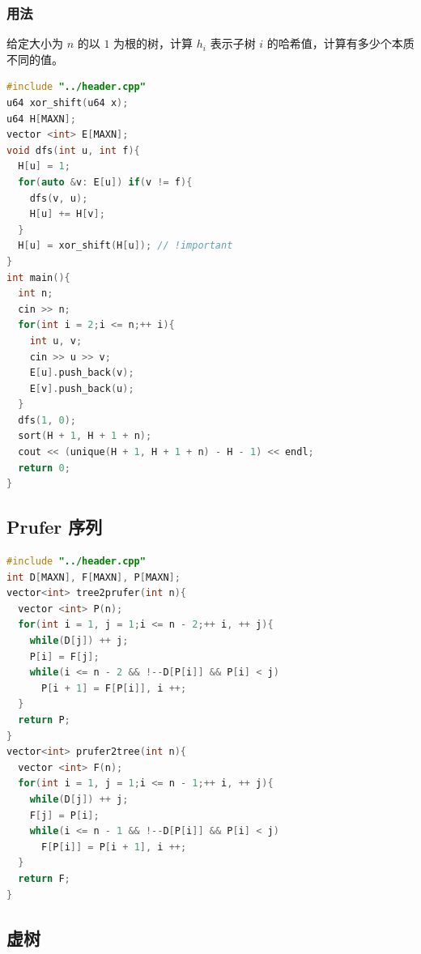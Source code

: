 \documentclass[10pt]{ctexart}
\begin{document}
\begin{multicols}{3}
    \subsubsection{用法}\label{ux7528ux6cd5}

    给定大小为 \(n\) 的以 \(1\) 为根的树，计算 \(h_i\) 表示子树 \(i\)
    的哈希值，计算有多少个本质不同的值。

\begin{lstlisting}[language={C++}]
#include "../header.cpp"
u64 xor_shift(u64 x);
u64 H[MAXN];
vector <int> E[MAXN];
void dfs(int u, int f){
  H[u] = 1;
  for(auto &v: E[u]) if(v != f){
    dfs(v, u);
    H[u] += H[v];
  }
  H[u] = xor_shift(H[u]); // !important
}
int main(){
  int n;
  cin >> n;
  for(int i = 2;i <= n;++ i){
    int u, v;
    cin >> u >> v;
    E[u].push_back(v);
    E[v].push_back(u);
  }
  dfs(1, 0);
  sort(H + 1, H + 1 + n);
  cout << (unique(H + 1, H + 1 + n) - H - 1) << endl;
  return 0;
}
\end{lstlisting}

    \subsection{Prufer 序列}\label{prufer-ux5e8fux5217}

\begin{lstlisting}[language={C++}]
#include "../header.cpp"
int D[MAXN], F[MAXN], P[MAXN];
vector<int> tree2prufer(int n){
  vector <int> P(n);
  for(int i = 1, j = 1;i <= n - 2;++ i, ++ j){
    while(D[j]) ++ j;
    P[i] = F[j];
    while(i <= n - 2 && !--D[P[i]] && P[i] < j)
      P[i + 1] = F[P[i]], i ++;
  }
  return P;
}
vector<int> prufer2tree(int n){
  vector <int> F(n);
  for(int i = 1, j = 1;i <= n - 1;++ i, ++ j){
    while(D[j]) ++ j;
    F[j] = P[i];
    while(i <= n - 1 && !--D[P[i]] && P[i] < j)
      F[P[i]] = P[i + 1], i ++;
  }
  return F;
}
\end{lstlisting}

    \subsection{虚树}\label{ux865aux6811}


\end{multicols}
\end{document}
